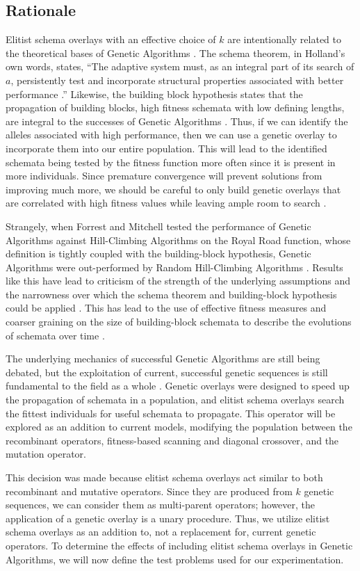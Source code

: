 \subsection*{Rationale}
Elitist schema overlays with an effective choice of $k$ are intentionally related to the theoretical bases of Genetic Algorithms \cite{Goldberg89, Holland75}. The schema theorem, in Holland's own words, states, ``The adaptive system must, as an integral part of its search of $a$, persistently test and incorporate structural properties associated with better performance \cite{Holland75}.'' Likewise, the building block hypothesis states that the propagation of building blocks, high fitness schemata with low defining lengths, are integral to the successes of Genetic Algorithms \cite{Goldberg89}. Thus, if we can identify the alleles associated with high performance, then we can use a genetic overlay to incorporate them into our entire population. This will lead to the identified schemata being tested by the fitness function more often since it is present in more individuals. Since premature convergence will prevent solutions from improving much more, we should be careful to only build genetic overlays that are correlated with high fitness values while leaving ample room to search \cite{Andre01}.

Strangely, when Forrest and Mitchell tested the performance of Genetic Algorithms against Hill-Climbing Algorithms on the Royal Road function, whose definition is tightly coupled with the building-block hypothesis, Genetic Algorithms were out-performed by Random Hill-Climbing Algorithms \cite{Forrest93}. Results like this have lead to criticism of the strength of the underlying assumptions and the narrowness over which the schema theorem and building-block hypothesis could be applied \cite{Burjorjee08, Senaratna05}. This has lead to the use of effective fitness measures and coarser graining on the size of building-block schemata to describe the evolutions of schemata over time \cite{Stephens99}.

The underlying mechanics of successful Genetic Algorithms are still being debated, but the exploitation of current, successful genetic sequences is still fundamental to the field as a whole \cite{Russell10, Senaratna05}. Genetic overlays were designed to speed up the propagation of schemata in a population, and elitist schema overlays search the fittest individuals for useful schemata to propagate. This operator will be explored as an addition to current models, modifying the population between the recombinant operators, fitness-based scanning and diagonal crossover, and the mutation operator. 

This decision was made because elitist schema overlays act similar to both recombinant and mutative operators. Since they are produced from $k$ genetic sequences, we can consider them as multi-parent operators; however, the application of a genetic overlay is a unary procedure. Thus, we utilize elitist schema overlays as an addition to, not a replacement for, current genetic operators. To determine the effects of including elitist schema overlays in Genetic Algorithms, we will now define the test problems used for our experimentation.